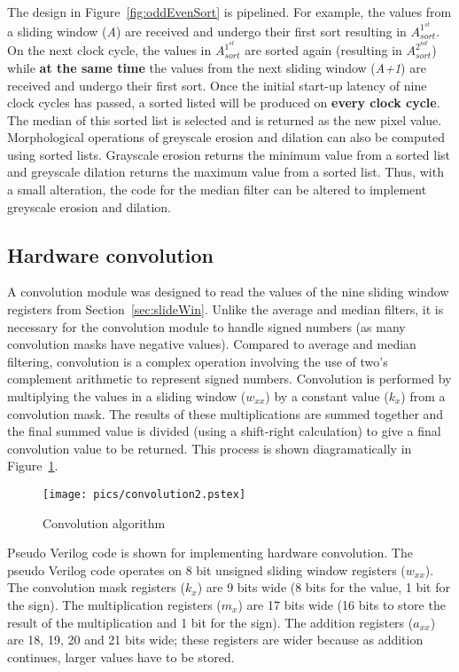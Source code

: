 \documentclass[10pt,twocolumn,letterpaper]{article}
\begin{document}
The design in Figure~\ref{fig:oddEvenSort} is pipelined. For example, the values from a sliding window (\emph{A}) are received and
undergo their first sort resulting in $A^{1^{st}}_{sort}$. On the next clock cycle, the values in $A^{1^{st}}_{sort}$ are sorted again
(resulting in $A^{2^{nd}}_{sort}$) while {\bf at the same time} the values from the next sliding window (\emph{A+1}) are received and undergo 
their first sort.
Once the initial start-up latency of nine clock cycles has passed, a sorted listed will be produced on {\bf every clock cycle}.
The median of this sorted list is selected and is returned as the new pixel value.
Morphological operations of greyscale erosion and dilation can also be computed using sorted lists. Grayscale
erosion returns the minimum value from a sorted list and greyscale dilation returns the maximum value from a sorted list.
Thus, with a small alteration, the code for the median filter can be altered to implement greyscale erosion and dilation.

\subsection{Hardware convolution}
\label{sec:conv}
A convolution module was designed to read the values of the nine sliding window registers from Section~\ref{sec:slideWin}.
Unlike the average and median filters, it is necessary for the convolution module to handle signed numbers (as many
convolution masks have negative values). Compared to average and median filtering, convolution is a complex operation
involving the use of two's complement arithmetic to represent signed numbers.
Convolution is performed by multiplying the values in a sliding window ($w_{xx}$) by a constant value ($k_{x}$) from a 
convolution mask. The results of these multiplications are summed together and 
the final summed value is divided (using a shift-right calculation) to give a final convolution value to be returned.
This process is shown diagramatically in Figure~\ref{fig:convolution}. 
\begin{figure}[!htb]
\begin{center}
\setlength{\abovecaptionskip}{-0.25cm}
        \texttt{[image: pics/convolution2.pstex]}
        \caption{Convolution algorithm}
        \label{fig:convolution}
\setlength{\abovecaptionskip}{0cm}
\end{center}
\end{figure}
Pseudo Verilog code is shown 
for implementing hardware convolution.
The pseudo Verilog code operates on 8 bit unsigned sliding window
registers ($w_{xx}$). The convolution mask registers ($k_{x}$) are 9 bits wide
(8 bits for the value, 1 bit for the sign). The multiplication 
registers ($m_{x}$) are 17 bits wide (16 bits to store the 
result of the multiplication and 1 bit for the sign). The addition
registers ($a_{xx}$) are 18, 19, 20 and 21 bits wide; these registers
are wider because as addition continues, larger values have to be stored.
\end{document}
